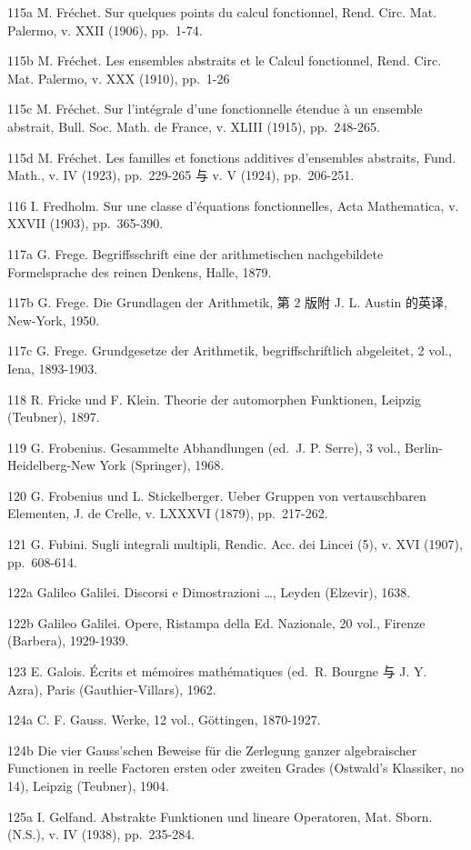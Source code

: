 115a M. Fréchet. Sur quelques points du calcul fonctionnel, Rend. Circ. Mat. Palermo, v. XXII (1906), pp.~1-74.

115b M. Fréchet. Les ensembles abstraits et le Calcul fonctionnel, Rend. Circ. Mat. Palermo, v. XXX (1910), pp.~1-26

115c M. Fréchet. Sur l'intégrale d'une fonctionnelle étendue à un ensemble abstrait, Bull. Soc. Math. de France, v. XLIII (1915), pp.~248-265.

115d M. Fréchet. Les familles et fonctions additives d'ensembles abstraits, Fund. Math., v. IV (1923), pp.~229-265 与 v. V (1924), pp.~206-251.

116 I. Fredholm. Sur une classe d'équations fonctionnelles, Acta Mathematica, v. XXVII (1903), pp.~365-390.

117a G. Frege. Begriffsschrift eine der arithmetischen nachgebildete Formelsprache des reinen Denkens, Halle, 1879.

117b G. Frege. Die Grundlagen der Arithmetik, 第 2 版附 J. L. Austin 的英译, New-York, 1950.

117c G. Frege. Grundgesetze der Arithmetik, begriffschriftlich abgeleitet, 2 vol., Iena, 1893-1903.

118 R. Fricke und F. Klein. Theorie der automorphen Funktionen, Leipzig (Teubner), 1897.

119 G. Frobenius. Gesammelte Abhandlungen (ed.~J. P. Serre), 3 vol., Berlin-Heidelberg-New York (Springer), 1968.

120 G. Frobenius und L. Stickelberger. Ueber Gruppen von vertauschbaren Elementen, J. de Crelle, v. LXXXVI (1879), pp.~217-262.

121 G. Fubini. Sugli integrali multipli, Rendic. Acc. dei Lincei (5), v. XVI (1907), pp.~608-614.

122a Galileo Galilei. Discorsi e Dimostrazioni \ldots, Leyden (Elzevir), 1638.

122b Galileo Galilei. Opere, Ristampa della Ed. Nazionale, 20 vol., Firenze (Barbera), 1929-1939.

123 E. Galois. Écrits et mémoires mathématiques (ed.~R. Bourgne 与 J. Y. Azra), Paris (Gauthier-Villars), 1962.

124a C. F. Gauss. Werke, 12 vol., Göttingen, 1870-1927.

124b Die vier Gauss'schen Beweise für die Zerlegung ganzer algebraischer Functionen in reelle Factoren ersten oder zweiten Grades (Ostwald's Klassiker, no 14), Leipzig (Teubner), 1904.

125a I. Gelfand. Abstrakte Funktionen und lineare Operatoren, Mat. Sborn. (N.S.), v. IV (1938), pp.~235-284.

